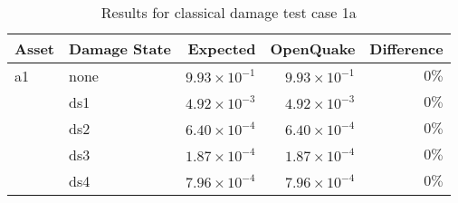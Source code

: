\begin{table}[htbp]

\centering
\begin{tabular}{ l l r r r }

\hline
\rowcolor{anti-flashwhite}
\bf{Asset} & \bf{Damage State} & \bf{Expected} & \bf{OpenQuake} & \bf{Difference}\\
\hline
a1 & none & $9.93 \times 10^{-1}$ & $9.93 \times 10^{-1}$ & $0\%$ \\
   & ds1 & $4.92 \times 10^{-3}$ & $4.92 \times 10^{-3}$ & $0\%$ \\
   & ds2 & $6.40 \times 10^{-4}$ & $6.40 \times 10^{-4}$ & $0\%$ \\
   & ds3 & $1.87 \times 10^{-4}$ & $1.87 \times 10^{-4}$ & $0\%$ \\
   & ds4 & $7.96 \times 10^{-4}$ & $7.96 \times 10^{-4}$ & $0\%$ \\
\hline
\end{tabular}

\caption{Results for classical damage test case 1a}
\label{tab:result-cd-1a}
\end{table}